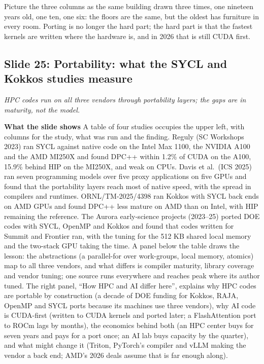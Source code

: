 \documentclass[11pt,letterpaper]{article}
\newcommand{\slide}[3]{%
  \subsection[Slide #1: #2]{Slide #1: #2}%
  {\color{muted}\itshape #3\par}\medskip}
\newcommand{\para}[1]{\medskip\noindent\textbf{#1}\quad}
\newenvironment{intuition}{\begin{tcolorbox}[intuitionbox]}{\end{tcolorbox}}
\begin{document}
\begin{intuition}
Picture the three columns as the same building drawn three times, one nineteen years old, one ten, one six: the floors are the same, but the oldest has furniture in every room. Porting is no longer the hard part; the hard part is that the fastest kernels are written where the hardware is, and in 2026 that is still CUDA first.
\end{intuition}

\slide{25}{Portability: what the SYCL and Kokkos studies measure}{HPC codes run on all three vendors through portability layers; the gaps are in maturity, not the model.}

\para{What the slide shows} A table of four studies occupies the upper left, with columns for the study, what was run and the finding. Reguly (SC Workshops 2023) ran SYCL against native code on the Intel Max 1100, the NVIDIA A100 and the AMD MI250X and found DPC++ within 1.2\% of CUDA on the A100, 15.9\% behind HIP on the MI250X, and weak on CPUs. Davis et al.\ (ICS 2025) ran seven programming models over five proxy applications on five GPUs and found that the portability layers reach most of native speed, with the spread in compilers and runtimes. ORNL/TM-2025/4398 ran Kokkos with SYCL back ends on AMD GPUs and found DPC++ less mature on AMD than on Intel, with HIP remaining the reference. The Aurora early-science projects (2023--25) ported DOE codes with SYCL, OpenMP and Kokkos and found that codes written for Summit and Frontier ran, with the tuning for the 512 KB shared local memory and the two-stack GPU taking the time. A panel below the table draws the lesson: the abstractions (a parallel-for over work-groups, local memory, atomics) map to all three vendors, and what differs is compiler maturity, library coverage and vendor tuning; one source runs everywhere and reaches peak where its author tuned. The right panel, ``How HPC and AI differ here'', explains why HPC codes are portable by construction (a decade of DOE funding for Kokkos, RAJA, OpenMP and SYCL ports because its machines use three vendors), why AI code is CUDA-first (written to CUDA kernels and ported later; a FlashAttention port to ROCm lags by months), the economics behind both (an HPC center buys for seven years and pays for a port once; an AI lab buys capacity by the quarter), and what might change it (Triton, PyTorch's compiler and vLLM making the vendor a back end; AMD's 2026 deals assume that is far enough along).
\end{document}
